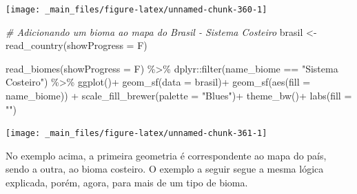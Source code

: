 \documentclass[
  brazilian,
]{book}
\newenvironment{Shaded}{\begin{snugshade}}{\end{snugshade}}
\newcommand{\AttributeTok}[1]{\textcolor[rgb]{0.77,0.63,0.00}{#1}}
\newcommand{\CommentTok}[1]{\textcolor[rgb]{0.56,0.35,0.01}{\textit{#1}}}
\newcommand{\FunctionTok}[1]{\textcolor[rgb]{0.00,0.00,0.00}{#1}}
\newcommand{\NormalTok}[1]{#1}
\newcommand{\OtherTok}[1]{\textcolor[rgb]{0.56,0.35,0.01}{#1}}
\newcommand{\SpecialCharTok}[1]{\textcolor[rgb]{0.00,0.00,0.00}{#1}}
\newcommand{\StringTok}[1]{\textcolor[rgb]{0.31,0.60,0.02}{#1}}
\begin{document}
\begin{center}\texttt{[image: \_main\_files/figure-latex/unnamed-chunk-360-1]} \end{center}

\begin{Shaded}
\begin{Highlighting}[]
\CommentTok{\# Adicionando um bioma ao mapa do Brasil {-} Sistema Costeiro}
\NormalTok{brasil }\OtherTok{\textless{}{-}} \FunctionTok{read\_country}\NormalTok{(}\AttributeTok{showProgress =}\NormalTok{ F)}

\FunctionTok{read\_biomes}\NormalTok{(}\AttributeTok{showProgress =}\NormalTok{ F) }\SpecialCharTok{\%\textgreater{}\%} 
\NormalTok{  dplyr}\SpecialCharTok{::}\FunctionTok{filter}\NormalTok{(name\_biome }\SpecialCharTok{==} \StringTok{"Sistema Costeiro"}\NormalTok{) }\SpecialCharTok{\%\textgreater{}\%} 
  \FunctionTok{ggplot}\NormalTok{()}\SpecialCharTok{+}
  \FunctionTok{geom\_sf}\NormalTok{(}\AttributeTok{data =}\NormalTok{ brasil)}\SpecialCharTok{+}
  \FunctionTok{geom\_sf}\NormalTok{(}\FunctionTok{aes}\NormalTok{(}\AttributeTok{fill =}\NormalTok{ name\_biome)) }\SpecialCharTok{+}
  \FunctionTok{scale\_fill\_brewer}\NormalTok{(}\AttributeTok{palette =} \StringTok{"Blues"}\NormalTok{)}\SpecialCharTok{+}
  \FunctionTok{theme\_bw}\NormalTok{()}\SpecialCharTok{+}
  \FunctionTok{labs}\NormalTok{(}\AttributeTok{fill =} \StringTok{""}\NormalTok{)}
\end{Highlighting}
\end{Shaded}

\begin{center}\texttt{[image: \_main\_files/figure-latex/unnamed-chunk-361-1]} \end{center}

No exemplo acima, a primeira geometria é correspondente ao mapa do país, sendo a outra, ao bioma costeiro. O exemplo a seguir segue a mesma lógica explicada, porém, agora, para mais de um tipo de bioma.
\end{document}
